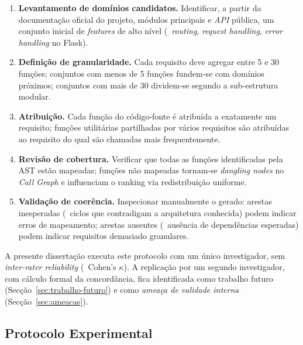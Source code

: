 \begin{enumerate}
    \item \textbf{Levantamento de domínios candidatos.} Identificar,
        a partir da documentação oficial do projeto, módulos
        principais e \emph{API} pública, um conjunto inicial de
        \emph{features} de alto nível (\eg\ \emph{routing},
        \emph{request handling}, \emph{error handling} no Flask).
    \item \textbf{Definição de granularidade.} Cada requisito deve
        agregar entre 5 e 30 funções; conjuntos com menos de 5
        funções fundem-se com domínios próximos; conjuntos com mais
        de 30 dividem-se segundo a sub-estrutura modular.
    \item \textbf{Atribuição.} Cada função do código-fonte é
        atribuída a exatamente um requisito; funções utilitárias
        partilhadas por vários requisitos são atribuídas ao
        requisito do qual são chamadas mais frequentemente.
    \item \textbf{Revisão de cobertura.} Verificar que todas as
        funções identificadas pela AST estão mapeadas; funções não
        mapeadas tornam-se \emph{dangling nodes} no \emph{Call Graph}
        e influenciam o ranking via redistribuição uniforme.
    \item \textbf{Validação de coerência.} Inspecionar
        manualmente o  gerado: arestas
        inesperadas (\eg\ ciclos que contradigam a arquitetura
        conhecida) podem indicar erros de mapeamento; arestas
        ausentes (\eg\ ausência de dependências esperadas) podem
        indicar requisitos demasiado granulares.
\end{enumerate}

\begin{notebox}
    A presente dissertação executa este protocolo com um único
    investigador, sem \emph{inter-rater reliability} (\eg\
    Cohen's $\kappa$). A replicação por um segundo investigador,
    com cálculo formal da concordância, fica identificada como
    trabalho futuro (Secção~\ref{sec:trabalho-futuro}) e como
    \emph{ameaça de validade interna}
    (Secção~\ref{sec:ameacas}).
\end{notebox}

\subsection{Protocolo Experimental}
\label{sec:protocolo-exp}

